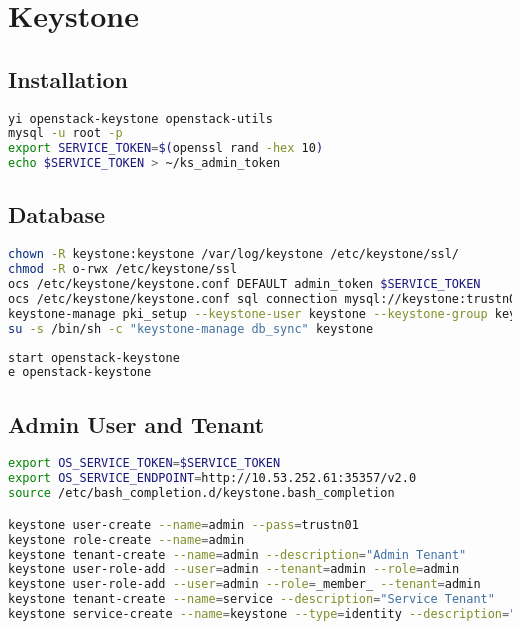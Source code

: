 \documentclass[11pt,letterpaper,oneside]{book}
\begin{document}
\chapter{Keystone}

\section{Installation}
\begin{lstlisting}[caption={Install Keystone packages},language=bash]
yi openstack-keystone openstack-utils 
mysql -u root -p
export SERVICE_TOKEN=$(openssl rand -hex 10)
echo $SERVICE_TOKEN > ~/ks_admin_token
\end{lstlisting}

\section{Database}

\begin{lstlisting}[caption={Keystone configuration},language=bash]
chown -R keystone:keystone /var/log/keystone /etc/keystone/ssl/
chmod -R o-rwx /etc/keystone/ssl
ocs /etc/keystone/keystone.conf DEFAULT admin_token $SERVICE_TOKEN
ocs /etc/keystone/keystone.conf sql connection mysql://keystone:trustn01@10.53.252.61/keystone
keystone-manage pki_setup --keystone-user keystone --keystone-group keystone 
su -s /bin/sh -c "keystone-manage db_sync" keystone
\end{lstlisting}

\begin{lstlisting}[caption={Start and enable Keystone},language=bash]
start openstack-keystone
e openstack-keystone
\end{lstlisting}


\section{Admin User and Tenant}
\begin{lstlisting}[caption={Keystone ???},language=bash]
export OS_SERVICE_TOKEN=$SERVICE_TOKEN
export OS_SERVICE_ENDPOINT=http://10.53.252.61:35357/v2.0
source /etc/bash_completion.d/keystone.bash_completion 

keystone user-create --name=admin --pass=trustn01
keystone role-create --name=admin
keystone tenant-create --name=admin --description="Admin Tenant"
keystone user-role-add --user=admin --tenant=admin --role=admin
keystone user-role-add --user=admin --role=_member_ --tenant=admin
keystone tenant-create --name=service --description="Service Tenant"
keystone service-create --name=keystone --type=identity --description="OpenStack Identity" keystone endpoint-create --service=keystone --publicurl=http://10.53.252.61:5000/v2.0 --internalurl=http://10.53.252.61:5000/v2.0 --adminurl=http://10.53.252.61:35357/v2.0
\end{lstlisting}
\end{document}
